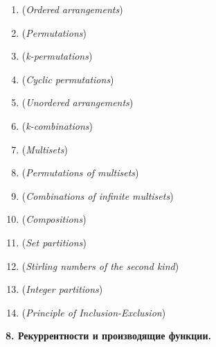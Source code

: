 \documentclass[12pt]{article}
\begin{document}
    \begin{enumerate}
        \item \textbf{} (\textit{Ordered arrangements})

        \item \textbf{} (\textit{Permutations})

        \item \textbf{} (\textit{k-permutations})

        \item \textbf{} (\textit{Cyclic permutations})

        \item \textbf{} (\textit{Unordered arrangements})

        \item \textbf{} (\textit{k-combinations})

        \item \textbf{} (\textit{Multisets})

        \item \textbf{} (\textit{Permutations of multisets})

        \item \textbf{} (\textit{Combinations of infinite multisets})

        \item \textbf{} (\textit{Compositions})

        \item \textbf{} (\textit{Set partitions})

        \item \textbf{} (\textit{Stirling numbers of the second kind})

        \item \textbf{} (\textit{Integer partitions})

        \item \textbf{} (\textit{Principle of Inclusion-Exclusion})

    \end{enumerate}

    \begin{center}
        \textbf{8. Рекуррентности и производящие функции.}
    \end{center}
\end{document}
